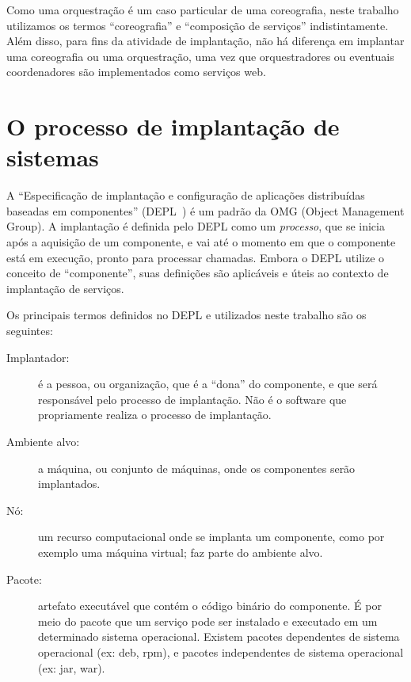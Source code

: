 Como uma orquestração é um caso particular de uma coreografia, neste trabalho utilizamos os termos ``coreografia'' e ``composição de serviços'' indistintamente. 
Além disso, para fins da atividade de implantação, não há diferença em implantar uma coreografia ou uma orquestração,
uma vez que orquestradores ou eventuais coordenadores são implementados como serviços web.

\section{O processo de implantação de sistemas}
\label{sec:implantacao}

A ``Especificação de implantação e configuração de aplicações distribuídas baseadas em componentes'' (DEPL~\cite{DEPL2006}) é um padrão da OMG (Object Management Group). 
A implantação é definida pelo DEPL como um \emph{processo}, que se inicia após a aquisição de um componente, e vai até o momento em que o componente está em execução, pronto para processar chamadas. 
Embora o DEPL utilize o conceito de ``componente'', suas definições são aplicáveis e úteis ao contexto de implantação de serviços.


Os principais termos definidos no DEPL e utilizados neste trabalho são os seguintes:

\begin{description}
\item [Implantador:] é a pessoa, ou organização, que é a ``dona'' do componente, e que será responsável pelo processo de implantação. Não é o software que propriamente realiza o processo de implantação.
\item [Ambiente alvo:] a máquina, ou conjunto de máquinas, onde os componentes serão implantados.
\item [Nó:] um recurso computacional onde se implanta um componente, 
como por exemplo uma máquina virtual; faz parte do ambiente alvo.
\item [Pacote:] artefato executável que contém o código binário do componente.
É por meio do pacote que um serviço pode ser instalado e executado em um determinado
sistema operacional. Existem pacotes dependentes de sistema operacional (ex: deb, rpm),
e pacotes independentes de sistema operacional (ex: jar, war).
\end{description}

